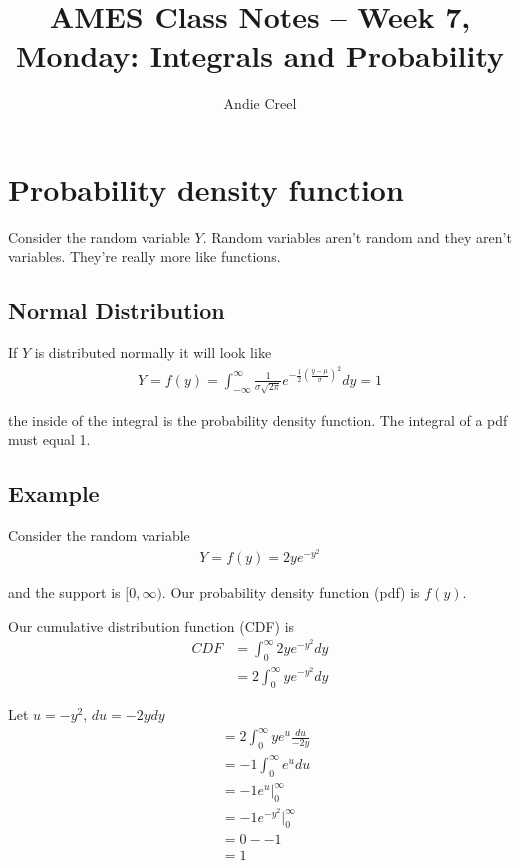 \documentclass{article}
\title{AMES Class Notes -- Week 7, Monday: Integrals and Probability}
\author{Andie Creel}
\begin{document}
\maketitle

\section{Probability density function}

Consider the random variable $Y$. Random variables aren't random and they aren't variables. They're really more like functions. \\

\subsection{Normal Distribution}
If $Y$ is distributed normally it will look like 
\begin{align}
    Y = f(y) = \int_{- \infty}^{\infty} \frac{1}{\sigma \sqrt{2 \pi}} e^{-\frac{1}{2}(\frac{y - \mu}{\sigma})^2} dy = 1
\end{align}

the inside of the integral is the probability density function. The integral of a pdf must equal 1. 

\subsection{Example}
Consider the random variable 
\begin{align}
    Y = f(y) = 2y e^{-y^2}
\end{align}

and the support is $[0, \infty )$. Our probability density function (pdf) is $f(y)$. 

Our cumulative distribution function (CDF) is 
\begin{align}
    CDF &= \int_0^\infty 2y e^{-y^2} dy \\
    &= 2 \int_0^\infty y e^{-y^2} dy
\end{align}

Let $u = -y^2$, $du = -2y dy$
\begin{align}
    &= 2 \int_0^\infty  ye^u \frac{du}{-2y} \\
    &= -1  \int_0^\infty e^u du \\
    &= -1 e^u \bigg |_0^\infty \\
    & = -1 e^{-y^2}\bigg |_0^\infty \\ 
    & = 0 - - 1\\
    & = 1
\end{align}
\end{document}
